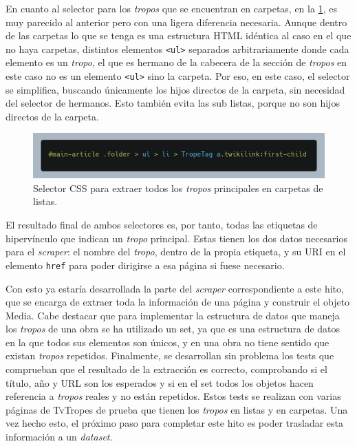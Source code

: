 En cuanto al selector para los \textit{tropos} que se encuentran en carpetas, en
la \ref{fig:selector-folder}, es muy parecido al anterior pero con una ligera
diferencia necesaria. Aunque dentro de las carpetas lo que se tenga es una
estructura HTML idéntica al caso en el que no haya carpetas, distintos elementos \texttt{<ul>} separados 
arbitrariamente donde cada elemento es un \textit{tropo}, el que es hermano de
la cabecera de la sección de \textit{tropos} en este caso no es un elemento \texttt{<ul>} sino 
la carpeta. Por eso, en este caso, el selector se simplifica,
buscando únicamente los hijos directos de la carpeta, sin necesidad del selector
de hermanos. Esto también evita las sub listas, porque no son hijos directos de
la carpeta.

\begin{figure}[ht]
    \includegraphics[width=\textwidth]{img/selector-tropes-folders.png}
    \caption{Selector CSS para extraer todos los \textit{tropos} principales en
    carpetas de listas.}
    \label{fig:selector-folder}
\end{figure}

El resultado final de ambos selectores es, por tanto, todas las etiquetas de
hipervínculo que indican un \textit{tropo} principal. Estas tienen los dos datos
necesarios para el \textit{scraper}: el nombre del \textit{tropo}, dentro de la
propia etiqueta, y su URI en el elemento \texttt{href} para poder dirigirse a
esa página si fuese necesario.

Con esto ya estaría desarrollada la parte del \textit{scraper} correspondiente a
este hito, que se encarga de extraer toda la información de una página y
construir el objeto Media. Cabe destacar que para implementar la estructura de
datos que maneja los \textit{tropos} de una obra se ha utilizado un set, ya que
es una estructura de datos en la que todos sus elementos son únicos, y en una
obra no tiene sentido que existan \textit{tropos} repetidos. Finalmente, se
desarrollan sin problema los tests que comprueban que el resultado de la
extracción es correcto, comprobando si el título, año y URL son los esperados y
si en el set todos los objetos hacen referencia a \textit{tropos} reales y no
están repetidos. Estos tests se realizan con varias páginas de TvTropes de
prueba que tienen los \textit{tropos} en listas y en carpetas. Una vez hecho
esto, el próximo paso para completar este hito es poder trasladar esta
información a un \textit{dataset}.

